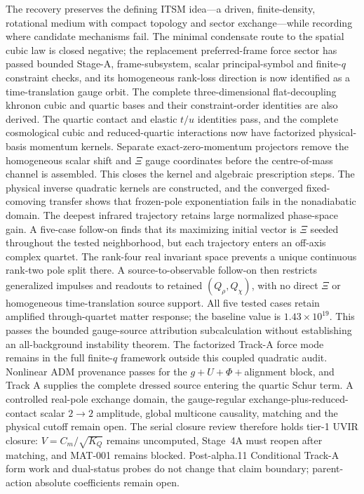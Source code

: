 \documentclass[11pt]{article}
\begin{document}
The recovery preserves the defining ITSM idea---a driven, finite-density,
rotational medium with compact topology and sector exchange---while recording
where candidate mechanisms fail.  The minimal condensate route to the spatial
cubic law is closed negative; the replacement preferred-frame force sector has
passed bounded Stage-A, frame-subsystem, scalar principal-symbol and finite-$q$
constraint checks, and its homogeneous rank-loss direction is now identified
as a time-translation gauge orbit.  The complete three-dimensional
flat-decoupling khronon cubic and quartic bases and their constraint-order
identities are also derived.  The quartic contact and elastic $t/u$ identities
pass, and the complete cosmological cubic and reduced-quartic interactions
now have factorized
physical-basis momentum kernels.  Separate exact-zero-momentum projectors
remove the homogeneous scalar shift and $\Xi$ gauge coordinates before the
centre-of-mass channel is assembled.  This closes the kernel and algebraic
prescription steps.  The physical inverse quadratic kernels are constructed,
and the converged fixed-comoving transfer shows that frozen-pole exponentiation
fails in the nonadiabatic domain.  The deepest infrared trajectory retains
large normalized phase-space gain.  A five-case follow-on finds that its
maximizing initial vector is $\Xi$ seeded throughout the tested neighborhood,
but each trajectory enters an off-axis complex quartet.  The rank-four real
invariant space prevents a unique continuous rank-two pole split there.  A
source-to-observable follow-on then restricts generalized impulses and
readouts to retained $(Q_\rho,Q_\chi)$, with no direct $\Xi$ or homogeneous
time-translation source support.  All five tested cases retain amplified
through-quartet matter response; the baseline value is
$1.43\times10^{19}$.  This passes the bounded gauge-source attribution
subcalculation without establishing an all-background instability theorem.
The factorized Track-A force mode remains in the full finite-$q$ framework
outside this coupled quadratic audit.  Nonlinear ADM provenance passes for
the $g+U+\Phi+$alignment block, and Track A supplies the complete dressed
source entering the quartic Schur term.  A controlled real-pole exchange
domain, the gauge-regular exchange-plus-reduced-contact scalar $2\to2$
amplitude, global multicone
causality, matching and the physical cutoff remain open.  The serial closure
review therefore holds tier-1 UVIR closure: $V=C_m/\sqrt{K_Q}$ remains
uncomputed, Stage~4A must reopen after matching, and MAT-001 remains blocked.
Post-alpha.11 Conditional Track-A form work and dual-status probes do not
change that claim boundary; parent-action absolute coefficients remain open.
\end{document}
